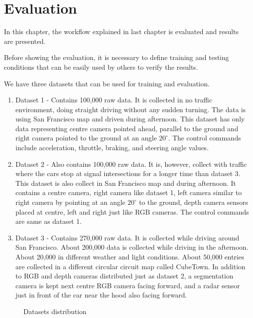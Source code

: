 \chapter{Evaluation}
In this chapter, the workflow explained in last chapter is evaluated and results are
presented.

Before showing the evaluation, it is necessary to define training and testing conditions
that can be easily used by others to verify the results.

We have three datasets that can be used for training and evaluation.
\begin{enumerate}
    \item Dataset 1 - Contains 100,000 raw data. It is collected in no traffic
        environment, doing straight driving without any sudden turning. The data is using
        San Francisco map and driven during afternoon. This dataset has only data
        representing centre camera pointed ahead, parallel to the ground and right camera
        pointed to the ground at an angle $20^{\circ}$. The control commands include
        acceleration, throttle, braking, and steering angle values.
    \item Dataset 2 - Also contains 100,000 raw data. It is, however, collect with traffic
        where the cars stop at signal intersections for a longer time than dataset 3. This
        dataset is also collect in San Francisco map and during afternoon. It contains a
        centre camera, right camera like dataset 1, left camera similar to right camera by
        pointing at an angle $20^{\circ}$ to the ground, depth camera sensors placed at
        centre, left and right just like RGB cameras. The control commands are same as
        dataset 1.
    \item Dataset 3 - Contains 270,000 raw data. It is collected while driving around San
        Francisco. About 200,000 data is collected while driving in the afternoon. About
        20,000 in different weather and light conditions. About 50,000 entries are
        collected in a different circular circuit map called CubeTown. In addition to RGB
        and depth cameras distributed just as dataset 2, a segmentation camera is kept
        next centre RGB camera facing forward, and a radar sensor just in front of the
        car near the hood also facing forward.

\end{enumerate}
\begin{figure}[h]
    \centering
    \def\svgwidth{0.3\textwidth}
    
    \caption{Datasets distribution}
    \label{fig:datasetsdistribution}
\end{figure}


